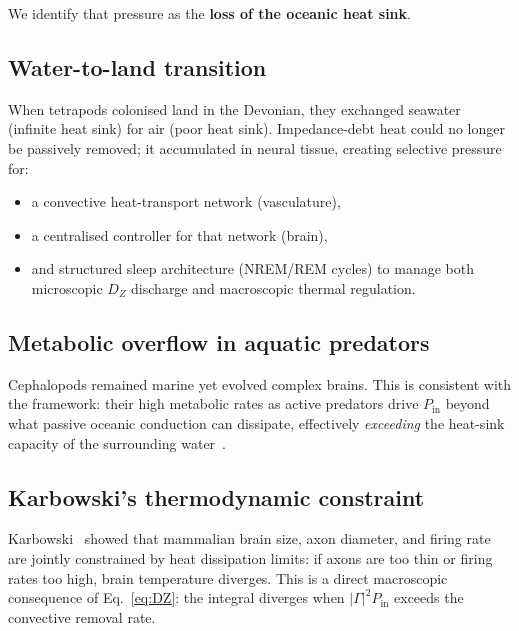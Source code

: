 ﻿\documentclass[aps,pre,twocolumn,superscriptaddress,floatfix]{revtex4-2}
\begin{document}
We identify that pressure as the
\textbf{loss of the oceanic heat sink}.

\subsection{Water-to-land transition}
\label{sec:water-land}

When tetrapods colonised land in the Devonian,
they exchanged seawater (infinite heat sink)
for air (poor heat sink).
Impedance-debt heat could no longer be passively
removed; it accumulated in neural tissue,
creating selective pressure for:
\begin{itemize}
  \item a convective heat-transport network (vasculature),
  \item a centralised controller for that network (brain),
  \item and structured sleep architecture (NREM/REM cycles)
    to manage both microscopic $D_Z$ discharge
    and macroscopic thermal regulation.
\end{itemize}

\subsection{Metabolic overflow in aquatic predators}

Cephalopods remained marine yet evolved complex brains.
This is consistent with the framework:
their high metabolic rates as active predators
drive $P_{\mathrm{in}}$ beyond what passive oceanic
conduction can dissipate,
effectively \emph{exceeding} the heat-sink capacity
of the surrounding water~\cite{Moroz2012}.

\subsection{Karbowski's thermodynamic constraint}

Karbowski~\cite{Karbowski2009} showed that mammalian
brain size, axon diameter, and firing rate are jointly
constrained by heat dissipation limits:
if axons are too thin or firing rates too high,
brain temperature diverges.
This is a direct macroscopic consequence of
Eq.~\eqref{eq:DZ}: the integral diverges when
$|\Gamma|^2 P_{\mathrm{in}}$ exceeds the
convective removal rate.


\end{document}
